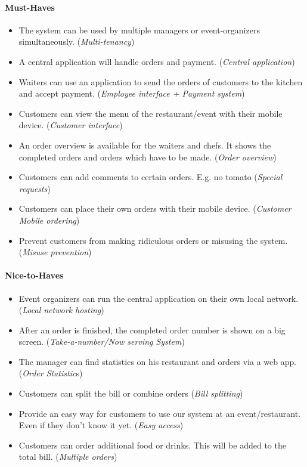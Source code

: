 \documentclass[12pt]{article}
\begin{document}
\begin{multicols}{2}
\paragraph{Must-Haves}
\begin{itemize}
	\raggedright
	\item The system can be used by multiple managers or event-organizers simultaneously. 
	(\textit{Multi-tenancy})
	\item A central application will handle orders and payment. 
	(\textit{Central application})
	\item Waiters can use an application to send the orders of customers to the kitchen and accept payment. 
	(\textit{Employee interface + Payment system})
	\item Customers can view the menu of the restaurant/event with their mobile device. 
	(\textit{Customer interface})
	\item An order overview is available for the waiters and chefs. It shows the completed orders and orders which have to be made. 
	(\textit{Order overview})
	\item Customers can add comments to certain orders. E.g. no tomato
	(\textit{Special requests}) 
	\item Customers can place their own orders with their mobile device. 
	(\textit{Customer Mobile ordering})
	\item Prevent customers from making ridiculous orders or misusing the system.
	(\textit{Misuse prevention})
\end{itemize}
\paragraph{Nice-to-Haves}
\begin{itemize}
	\raggedright
	\item Event organizers can run the central application on their own local network. 
	(\textit{Local network hosting})
	\item After an order is finished, the completed order number is shown on a big screen. 
	(\textit{Take-a-number/Now serving System})
	\item The manager can find statistics on his restaurant and orders via a web app. 
	(\textit{Order Statistic}s)
	\item Customers can split the bill or combine orders 
	(\textit{Bill splitting})
	\item Provide an easy way for customers to use our system at an event/restaurant. Even if they don’t know it yet. 
	(\textit{Easy access})
	\item Customers can order additional food or drinks. This will be added to the total bill.
	(\textit{Multiple orders})
\end{itemize}


\end{multicols}
\end{document}
